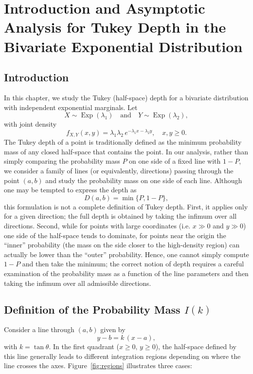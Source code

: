 \chapter{Introduction and Asymptotic Analysis for Tukey Depth in the Bivariate Exponential Distribution}

\section{Introduction}

In this chapter, we study the Tukey (half-space) depth for a bivariate distribution with independent exponential marginals. Let
\[
X \sim \operatorname{Exp}(\lambda_1) \quad\text{and}\quad Y \sim \operatorname{Exp}(\lambda_2),
\]
with joint density
\[
f_{X,Y}(x,y)=\lambda_1\lambda_2 \, e^{-\lambda_1 x-\lambda_2 y},\quad x,y \ge 0.
\]
The Tukey depth of a point is traditionally defined as the minimum probability mass of any closed half-space that contains the point. In our analysis, rather than simply comparing the probability mass \(P\) on one side of a fixed line with \(1-P\), we consider a family of lines (or equivalently, directions) passing through the point \((a,b)\) and study the probability mass on one side of each line. Although one may be tempted to express the depth as
\[
D(a,b)=\min\{P,1-P\},
\]
this formulation is not a complete definition of Tukey depth. First, it applies only for a given direction; the full depth is obtained by taking the infimum over all directions. Second, while for points with large coordinates (i.e. \(x \gg 0\) and \(y \gg 0\)) one side of the half-space tends to dominate, for points near the origin the “inner” probability (the mass on the side closer to the high-density region) can actually be lower than the “outer” probability. Hence, one cannot simply compute \(1-P\) and then take the minimum; the correct notion of depth requires a careful examination of the probability mass as a function of the line parameters and then taking the infimum over all admissible directions.


\section{Definition of the Probability Mass \( I(k) \)}

Consider a line through \((a,b)\) given by
\begin{equation}\label{eq:line}
  y - b = k\,(x - a),
\end{equation}
with \(k = \tan\theta\). In the first quadrant (\(x\ge0,\, y\ge0\)), the half-space defined by this line generally leads to different integration regions depending on where the line crosses the axes. Figure~\ref{fig:regions} illustrates three cases:

